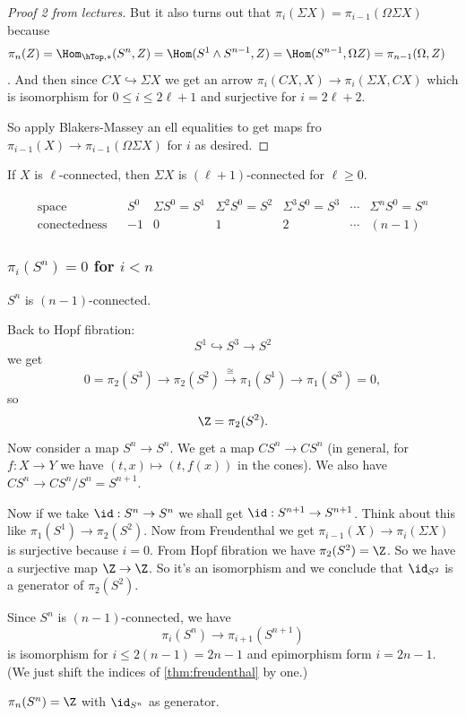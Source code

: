 \begin{remark}
\begin{proof}[Proof 2 from lectures]
	But it also turns out that $\pi_i(\Sigma X)=\pi_{i-1}(\Omega\Sigma X)$ because
	\begin{align*}
		\pi_n(Z)&=\Hom_{\hTop,*}(S^n,Z)=\Hom(S^1\wedge S^{n-1},Z)=\Hom(S^{n-1},\Omega Z)=\pi_{n-1}(\Omega,Z)
	\end{align*}.
	And then since $CX\hookrightarrow \Sigma X$ we get an arrow $\pi_i(CX,X)\to\pi_i(\Sigma X,CX)$ which is isomorphism for $0\leq i \leq 2\ell +1$ and surjective for $i=2\ell+2$.
	
	So apply Blakers-Massey an ell equalities to get maps fro $\pi_{i-1}(X)\to\pi_{i-1}(\Omega\Sigma X)$ for $i$ as desired.
\end{proof}
\begin{coro}
	If $X$ is $\ell$-connected, then $\Sigma X$ is $(\ell+1)$-connected for $\ell\geq0$.
\end{coro}
\[\begin{matrix}
	\text{space}&&S^0&\Sigma S^0=S^1&\Sigma^2S^0=S^2&\Sigma^3S^0=S^3&\cdots&\Sigma^nS^0=S^n\\
	\text{conectedness}&&-1&0&1&2&\cdots&(n-1)
\end{matrix}\]

\subsubsection{\texorpdfstring{$\pi_{i}(S^{n})=0$}{πᵢ(Sⁿ)} for \texorpdfstring{$i<n$}{i<n}}

\begin{coro}
	$S^n$ is $(n-1)$-connected.
\end{coro}
Back to Hopf fibration:
\[S^1\hookrightarrow S^3\to S^2\]
we get
\[0=\pi_2(S^3)\to\pi_2(S^2)\overset{\cong}{\to}\pi_1(S^1)\to\pi_1(S^3)=0,\]
so
\[\Z=\pi_2(S^2).\]
Now consider a map $S^n\to S^n$. We get a map $CS^n\to CS^n$ (in general, for $f:X\to Y$ we have $(t,x)\mapsto(t,f(x))$ in the cones). We also have $CS^n\to CS^n/S^n=S^{n+1}$.

Now if we take $\id:S^n\to S^n$ we shall get $\id:S^{n+1}\to S^{n+1}$. Think about this like $\pi_1(S^1)\to\pi_2(S^2)$. Now from Freudenthal we get $\pi_{i-1}(X)\to\pi_i(\Sigma X)$ is surjective because $i=0$. From Hopf fibration we have $\pi_2(S^2)=\Z$. So we have a surjective map $\Z\to\Z$. So it's an isomorphism and we conclude that $\id_{S^2}$ is a generator of $\pi_2(S^2)$.
\begin{coro}
	Since $S^n$ is $(n-1)$-connected, we have
	\[\pi_i(S^n)\to\pi_{i+1}(S^{n+1})\]
	is isomorphism for $i\leq 2(n-1)=2n-1$ and epimorphism form $i=2n-1$. (We just shift the indices of \cref{thm:freudenthal} by one.)
\end{coro}
\begin{coro}
	$\pi_n(S^n)=\Z$ with $\id_{S^n}$ as generator.
\end{coro}


\end{remark}
